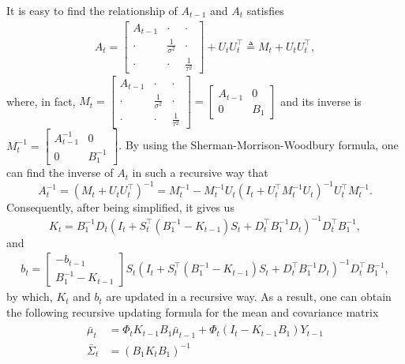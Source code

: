 It is easy to find the relationship of $A_{t-1}$ and $A_{t}$ satisfies  
\begin{align} A_{t} = 
\begin{bmatrix}
A_{t-1} & \cdot & \cdot  \\ \cdot &\frac{1}{\sigma^2} &\cdot  \\ \cdot  & \cdot  & \frac{1}{\tau^2} 
\end{bmatrix} + U_{t}U_{t}^\top \triangleq M_{t}  + U_{t}U_{t}^\top,
\end{align}
where, in fact, $M_{t} = \begin{bmatrix}
A_{t-1} & \cdot & \cdot  \\ \cdot &\frac{1}{\sigma^2} &\cdot  \\ \cdot  & \cdot  & \frac{1}{\tau^2}
\end{bmatrix}  = \begin{bmatrix}
A_{t-1} & 0 \\ 0 & B_1
\end{bmatrix}$ 
and its inverse is $M_{t}^{-1} =\begin{bmatrix}
A_{t-1}^{-1} & 0 \\ 0 & B_1^{-1}
\end{bmatrix}$. By using the Sherman-Morrison-Woodbury formula, one can find the inverse of $A_{t}$ in such a recursive way that 
\begin{equation}
A_{t}^{-1} = \left(M_{t}+U_{t}U_{t}^\top\right)^{-1}= M_{t}^{-1}-M_{t}^{-1}U_{t}\left(I_t+U_{t}^\top M_{t}^{-1}U_{t}\right)^{-1}U_{t}^\top M_{t}^{-1}.
\end{equation}
Consequently, after being simplified, it gives us 
\begin{equation}\label{OUupdatingK}
K_{t} =B_1^{-1}D_{t} \left(I_t+ S_{t}^\top \left(B_1^{-1} - K_{t-1}\right)  S_{t} +D_{t}^\top B_1^{-1}D_{t}  \right)^{-1}  D_{t}^\top B_1^{-1},
\end{equation}
and
\begin{align}
b_{t} = \begin{bmatrix}
-b_{t-1} \\ B_1^{-1}-K_{t-1} 
\end{bmatrix}  S_{t} \left(I_t+ S_{t}^\top \left(B_1^{-1} - K_{t-1}\right)  S_{t} +D_{t}^\top B_1^{-1}D_{t}  \right)^{-1} D_{t}^\top B_1^{-1}, 
\end{align}
by which, $K_t$ and $b_t$ are updated in a recursive way. As a result, one can obtain the following recursive updating formula for the mean and covariance matrix 
\begin{align}
\begin{split}
\bar{\mu}_{t}&=\Phi_{t} K_{t-1}B_1\bar{\mu}_{t-1} + \Phi_{t} \left(I_t-K_{t-1}B_1\right)Y_{t-1}\\
\bar{\Sigma}_{t}&=\left(B_1K_{t}B_1\right)^{-1}
\end{split}
\end{align}
